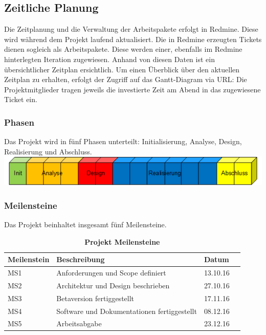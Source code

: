\documentclass[a4,12pt]{scrartcl}
\begin{document}
\subsection{Zeitliche Planung}
Die Zeitplanung und die Verwaltung der Arbeitspakete erfolgt in Redmine. Diese wird während dem Projekt laufend aktualisiert. Die in Redmine erzeugten Tickets dienen sogleich als Arbeitspakete. Diese werden einer, ebenfalls im Redmine hinterlegten Iteration zugewiesen. Anhand von diesen Daten ist ein übersichtlicher Zeitplan ersichtlich. Um einen Überblick über den aktuellen Zeitplan zu erhalten, erfolgt der Zugriff auf das Gantt-Diagram via URL:
Die Projektmitglieder tragen jeweils die investierte Zeit am Abend in das zugewiesene Ticket ein. 

\subsubsection{Phasen}
Das Projekt wird in fünf Phasen unterteilt: Initialisierung, Analyse, Design, Realisierung und Abschluss.
\newline
\newline
\includegraphics[width=1\textwidth]{figures/phasen.png}
\newpage

\subsubsection{Meilensteine}
Das Projekt beinhaltet insgesamt fünf Meilensteine. \\
\begin{table}[H]
    \begin{tabular}{@{} l l l r@{}}\toprule    
    {Meilenstein} & {Beschreibung} & {Datum}\\ \midrule
    MS1 & Anforderungen und Scope definiert  & 13.10.16\\ \addlinespace
    MS2 & Architektur und Design beschrieben & 27.10.16\\ \addlinespace
    MS3 & Betaversion fertiggestellt  & 17.11.16\\ \addlinespace
    MS4 & Software und Dokumentationen fertiggestellt  & 08.12.16\\ \addlinespace
    MS5 & Arbeitsabgabe & 23.12.16\\ 
    \bottomrule
    \end{tabular}
\caption{\textbf{Projekt Meilensteine}}
\end{table}
\end{document}
